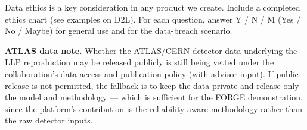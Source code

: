 \preparedby
\begin{guidance}
Data ethics is a key consideration in any product we create. Include a completed ethics chart (see examples on D2L). For each question, answer Y / N / M (Yes / No / Maybe) for general use and for the data-breach scenario.
\end{guidance}

\noindent\textbf{ATLAS data note.} Whether the ATLAS/CERN detector data underlying the LLP reproduction may be released publicly is still being vetted under the collaboration's data-access and publication policy (with advisor input). If public release is not permitted, the fallback is to keep the data private and release only the model and methodology --- which is sufficient for the FORGE demonstration, since the platform's contribution is the reliability-aware methodology rather than the raw detector inputs.

